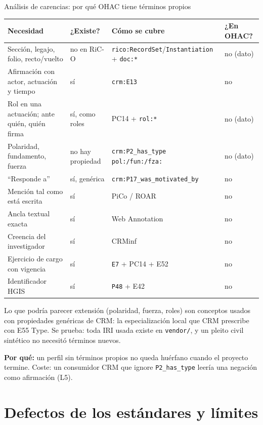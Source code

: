 \documentclass[aspectratio=169,10pt]{beamer}
\newcommand{\ttt}[1]{\texttt{\small #1}}
\newcommand{\porque}[1]{\par\smallskip\colorbox{ocre!10}{\parbox{\dimexpr\linewidth-2\fboxsep}{\footnotesize\textbf{Por qué:} #1}}}
\begin{document}
\begin{frame}[shrink=16]{Análisis de carencias: por qué OHAC tiene \cifraTerminosPropios{} términos propios}
\scriptsize
\begin{tabular}{@{}p{4.3cm}p{2.5cm}p{4.3cm}p{1.6cm}@{}}
\toprule
Necesidad & ¿Existe? & Cómo se cubre & ¿En OHAC? \\
\midrule
Sección, legajo, folio, recto/vuelto & no en RiC-O & \ttt{rico:RecordSet}/\ttt{Instantiation} + \ttt{doc:*} & no (dato) \\
Afirmación con actor, actuación y tiempo & sí & \ttt{crm:E13} & no \\
Rol en una actuación; ante quién, quién firma & sí, como roles & PC14 + \ttt{rol:*} & no (dato) \\
Polaridad, fundamento, fuerza & no hay propiedad & \ttt{crm:P2\_has\_type pol:/fun:/fza:} & no (dato) \\
\enquote{Responde a} & sí, genérica & \ttt{crm:P17\_was\_motivated\_by} & no \\
Mención tal como está escrita & sí & PiCo / ROAR & no \\
Ancla textual exacta & sí & Web Annotation & no \\
Creencia del investigador & sí & CRMinf & no \\
Ejercicio de cargo con vigencia & sí & \ttt{E7} + PC14 + E52 & no \\
Identificador HGIS & sí & \ttt{P48} + E42 & no \\
\bottomrule
\end{tabular}

\medskip
\small Lo que podría parecer extensión (polaridad, fuerza, roles) son \alert{conceptos} usados con propiedades genéricas de
CRM: la especialización local que CRM prescribe con E55 Type. Se prueba: toda IRI usada existe en \ttt{vendor/}, y un
pleito civil sintético no necesitó términos nuevos.
\porque{un perfil sin términos propios no queda huérfano cuando el proyecto termine. Coste: un consumidor CRM que
ignore \ttt{P2\_has\_type} leería una negación como afirmación (L5).}
\end{frame}

\section{Defectos de los estándares y límites}
\end{document}
